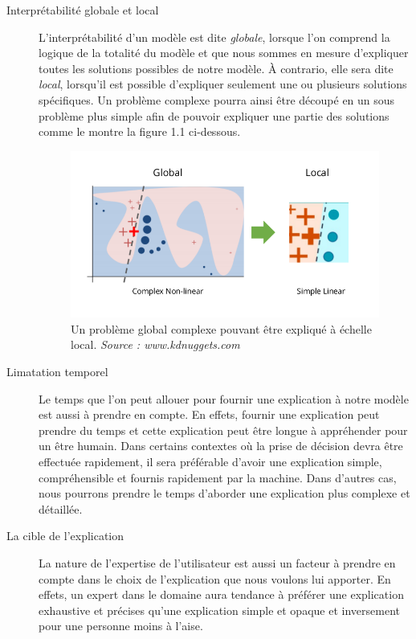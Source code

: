\begin{description}
\item[Interprétabilité globale et local] L'interprétabilité d'un modèle est dite \textit{globale}, lorsque l'on comprend la logique de la totalité du modèle et que nous sommes en mesure d'expliquer toutes les solutions possibles de notre modèle. À contrario, elle sera dite \textit{local}, lorsqu'il est possible d'expliquer seulement une ou plusieurs solutions spécifiques. Un problème complexe pourra ainsi être découpé en un sous problème plus simple afin de pouvoir expliquer une partie des solutions comme le montre la figure 1.1 ci-dessous.
\begin{figure}[h]
\centering
\includegraphics[scale=0.4]{src_img/globalVSlocal.png}
\caption{Un problème global complexe pouvant être expliqué à échelle local. \textit{Source : www.kdnuggets.com}}
\label{globalVSlocal}
\end{figure}

\item[Limatation temporel] Le temps que l'on peut allouer pour fournir une explication à notre modèle est aussi à prendre en compte. En effets, fournir une explication peut prendre du temps et cette explication peut être longue à appréhender pour un être humain. Dans certains contextes où la prise de décision devra être effectuée rapidement, il sera préférable d'avoir une explication simple, compréhensible et fournis rapidement par la machine. Dans d'autres cas, nous pourrons prendre le temps d'aborder une explication plus complexe et détaillée.

\item[La cible de l'explication] La nature de l'expertise de l'utilisateur est aussi un facteur à prendre en compte dans le choix de l'explication que nous voulons lui apporter. En effets, un expert dans le domaine aura tendance à préférer une explication exhaustive et précises qu'une explication simple et opaque et inversement pour une personne moins à l'aise.
\end{description}

